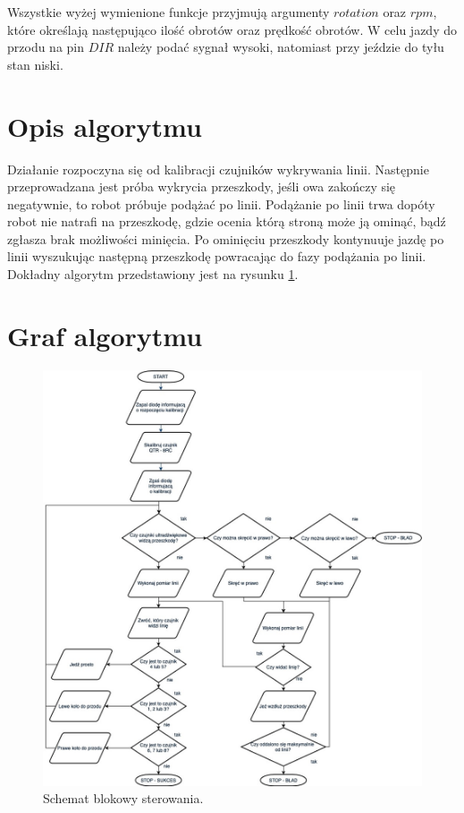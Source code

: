 Wszystkie wyżej wymienione funkcje przyjmują argumenty $rotation$ oraz $rpm$, które określają następująco ilość obrotów oraz prędkość obrotów.
W celu jazdy do przodu na pin $DIR$ należy podać sygnał wysoki, natomiast przy jeździe do tyłu stan niski.

\section{Opis algorytmu}
Działanie rozpoczyna się od kalibracji czujników wykrywania linii. Następnie przeprowadzana jest próba wykrycia przeszkody, jeśli owa zakończy się negatywnie, to robot próbuje podążać po linii. Podążanie po linii trwa dopóty robot nie natrafi na przeszkodę, gdzie ocenia którą stroną może ją ominąć, bądź zgłasza brak możliwości minięcia. Po ominięciu przeszkody kontynuuje jazdę po linii wyszukując następną przeszkodę powracając do fazy podążania po linii. Dokładny algorytm przedstawiony jest na rysunku \ref{fig:schemat_blokowy}.
\section{Graf algorytmu}
\begin{figure}[H]
\centering
\includegraphics[width=\textwidth]{inzynierku/img/diagram}
\caption{\label{fig:schemat_blokowy}Schemat blokowy sterowania.}
\end{figure}